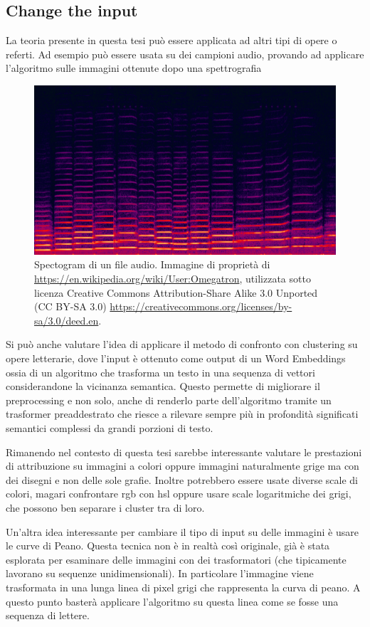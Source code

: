 \subsection{Change the input}
La teoria presente in questa tesi può essere applicata ad altri tipi di opere o referti. Ad esempio può essere usata su dei campioni audio, provando ad applicare l'algoritmo sulle immagini ottenute dopo una spettrografia

\begin{figure}[h]
	\includegraphics[width=0.8\linewidth]{Figures/Spectrogram.png}
	\caption[Spectogram of a file audio]{Spectogram di un file audio. Immagine di proprietà di \url{https://en.wikipedia.org/wiki/User:Omegatron}, utilizzata sotto licenza Creative Commons Attribution-Share Alike 3.0 Unported (CC BY-SA 3.0) \url{https://creativecommons.org/licenses/by-sa/3.0/deed.en}.}
\end{figure}

\noindent Si può anche valutare l'idea di applicare il metodo di confronto con clustering su opere letterarie, dove l'input è ottenuto come output di un Word Embeddings ossia di un algoritmo che trasforma un testo in una sequenza di vettori considerandone la vicinanza semantica. Questo permette di migliorare il preprocessing e non solo, anche di renderlo parte dell'algoritmo tramite un trasformer preaddestrato che riesce a rilevare sempre più in profondità significati semantici complessi da grandi porzioni di testo.

\noindent Rimanendo nel contesto di questa tesi sarebbe interessante valutare le prestazioni di attribuzione su immagini a colori oppure immagini naturalmente grige ma con dei disegni e non delle sole grafie. Inoltre potrebbero essere usate diverse scale di colori, magari confrontare \gls{rgb} con \gls{hsl} oppure usare scale logaritmiche dei grigi, che possono ben separare i cluster tra di loro.

\noindent Un'altra idea interessante per cambiare il tipo di input su delle immagini è usare le curve di Peano. Questa tecnica non è in realtà così originale, già è stata esplorata per esaminare delle immagini con dei trasformatori (che tipicamente lavorano su sequenze unidimensionali). In particolare l'immagine viene trasformata in una lunga linea di pixel grigi che rappresenta la curva di peano. A questo punto basterà applicare l'algoritmo su questa linea come se fosse una sequenza di lettere.

